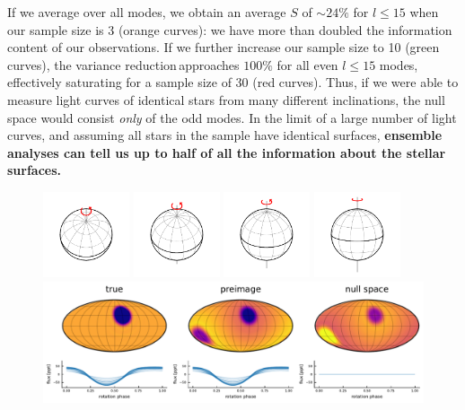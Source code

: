 \documentclass[modern]{aastex62}
\newcommand{\shrinkage}{{variance reduction\,}}
\begin{document}
If we average over all modes, we obtain an average $S$ of $\sim 24\%$
for $l\leq15$ when our sample size is 3 (orange curves): we have more than doubled the
information content of our observations. If we further increase our sample size
to 10 (green curves), the \shrinkage approaches $100\%$ for all even $l\leq15$
modes, effectively saturating for a sample size of 30 (red curves).
Thus, if we were able to measure light curves of identical stars
from many different inclinations, the null space would consist \emph{only}
of the odd modes. In the limit of a large number of light curves,
and assuming all stars in the sample have identical surfaces,
\textbf{ensemble analyses can tell us up to
    half of all the information about the stellar surfaces.}

\begin{figure}[p!]
    \begin{centering}
        \vspace{-4em}
        \includegraphics[width=1in]{figures/wireframe_30.pdf}
        \includegraphics[width=1in]{figures/wireframe_45.pdf}
        \includegraphics[width=1in]{figures/wireframe_60.pdf}
        \includegraphics[width=1in]{figures/wireframe_75.pdf}
        \\[0.5em]
        \includegraphics[width=\linewidth]{figures/nullspace_preimage_a.pdf}

\end{centering}
\end{figure}
\end{document}

